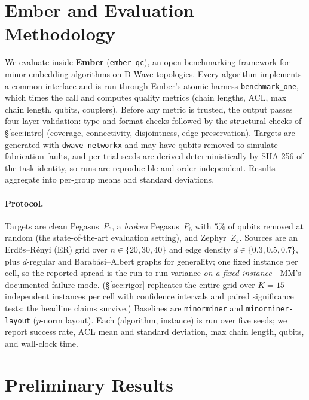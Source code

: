 \documentclass[acmsmall,anonymous,nonacm]{acmart}
\begin{document}
\section{Ember and Evaluation Methodology}
\label{sec:ember}

We evaluate inside \textbf{Ember} (\texttt{ember-qc}), an open benchmarking
framework for minor-embedding algorithms on D-Wave topologies. Every algorithm
implements a common interface and is run through Ember's atomic harness
\texttt{benchmark\_one}, which times the call and computes quality metrics
(chain lengths, ACL, max chain length, qubits, couplers). Before any metric is
trusted, the output passes four-layer validation: type and format checks
followed by the structural checks of \S\ref{sec:intro} (coverage, connectivity,
disjointness, edge preservation). Targets are generated with
\texttt{dwave-networkx} and may have qubits removed to simulate fabrication
faults, and per-trial seeds are derived deterministically by SHA-256 of the task
identity, so runs are reproducible and order-independent. Results aggregate into
per-group means and standard deviations.

\paragraph{Protocol.}
Targets are clean Pegasus~$P_6$, a \emph{broken} Pegasus~$P_6$ with $5\%$ of
qubits removed at random (the state-of-the-art evaluation setting), and
Zephyr~$Z_4$. Sources are an Erd\H{o}s--R\'enyi (ER) grid over
$n\in\{20,30,40\}$ and edge density $d\in\{0.3,0.5,0.7\}$, plus $d$-regular and
Barab\'asi--Albert graphs for generality; one fixed instance per cell, so the
reported spread is the run-to-run variance \emph{on a fixed instance}---MM's
documented failure mode. (\S\ref{sec:rigor} replicates the entire grid over
$K{=}15$ independent instances per cell with confidence intervals and paired
significance tests; the headline claims survive.) Baselines are \texttt{minorminer}
and
\texttt{minorminer-layout} ($p$-norm layout). Each (algorithm, instance) is run
over five seeds; we report success rate, ACL mean and standard deviation, max
chain length, qubits, and wall-clock time.

\section{Preliminary Results}
\label{sec:results}
\end{document}

